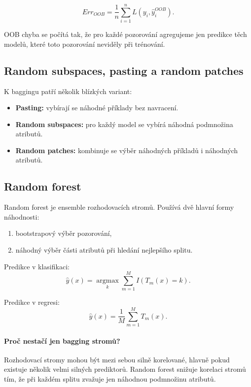 \[
Err_{OOB}
=
\frac{1}{n}
\sum_{i=1}^n
L(y_i,\hat{y}^{OOB}_i).
\]

OOB chyba se počítá tak, že pro každé pozorování agregujeme jen predikce těch modelů, které toto pozorování
neviděly při trénování.

\subsection{Random subspaces, pasting a random patches}

K baggingu patří několik blízkých variant:

\begin{itemize}
    \item \textbf{Pasting:}
    vybírají se náhodné příklady bez navracení.
    
    \item \textbf{Random subspaces:}
    pro každý model se vybírá náhodná podmnožina atributů.
    
    \item \textbf{Random patches:}
    kombinuje se výběr náhodných příkladů i náhodných atributů.
\end{itemize}

\subsection{Random forest}

Random forest je ensemble rozhodovacích stromů. Používá dvě hlavní formy náhodnosti:

\begin{enumerate}
    \item bootstrapový výběr pozorování,
    \item náhodný výběr části atributů při hledání nejlepšího splitu.
\end{enumerate}

Predikce v klasifikaci:
\[
\hat{y}(x)
=
\underset{k}{\operatorname{argmax}}
\sum_{m=1}^M
I(T_m(x)=k).
\]

Predikce v regresi:
\[
\hat{y}(x)
=
\frac{1}{M}
\sum_{m=1}^M
T_m(x).
\]

\paragraph{Proč nestačí jen bagging stromů?}
Rozhodovací stromy mohou být mezi sebou silně korelované, hlavně pokud existuje několik velmi silných
prediktorů. Random forest snižuje korelaci stromů tím, že při každém splitu zvažuje jen náhodnou podmnožinu
atributů.

